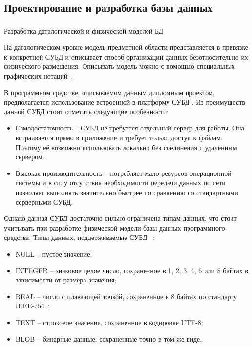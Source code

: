\subsection{Проектирование и разработка базы данных}
\label{sec:design:database}

\subsubsection{} Разработка даталогической и физической моделей БД
\label{sec:design:database:model}

На даталогическом уровне модель предметной области представляется в привязке к конкретной СУБД и описывает способ организации данных безотносительно их физического размещения.
Описывать модель можно с помощью специальных графических нотаций~\cite{kulikov_db_workbook}.

В программном средстве, описываемом данным дипломным проектом, предполагается использование встроенной в платформу \andro СУБД \sqlite.
Из преимуществ данной СУБД стоит отметить следующие особенности:
\begin{itemize}
    \item Самодостаточность -- СУБД \sqlite не требуется отдельный сервер для работы.
    Она встраивается прямо в приложение и требует только доступ к файлам.
    Поэтому её возможно использовать локально без соединения с удаленным сервером.
    \item Высокая производительность – \sqlite потребляет мало ресурсов операционной системы и в силу отсутствия необходимости передачи данных по сети позволяет выполнять значительно быстрее по сравнению со стандартными серверными СУБД.
\end{itemize}

Однако данная СУБД достаточно сильно ограничена типам данных, что стоит учитывать при разработке физической модели базы данных программного средства.
Типы данных, поддерживаемые СУБД \sqlite~\cite{sqlite_types}:
\begin{itemize}
    \item NULL -- пустое значение;
    \item INTEGER -- знаковое целое число, сохраненное в 1, 2, 3, 4, 6 или 8 байтах в зависимости от размера значения;
    \item REAL -- число с плавающей точкой, сохраненное в 8 байтах по стандарту IEEE-754~\cite{ieee_754};
    \item TEXT -- строковое значение, сохраненное в кодировке UTF-8;
    \item BLOB -- бинарные данные, сохраненные точно в том же виде.
\end{itemize}


